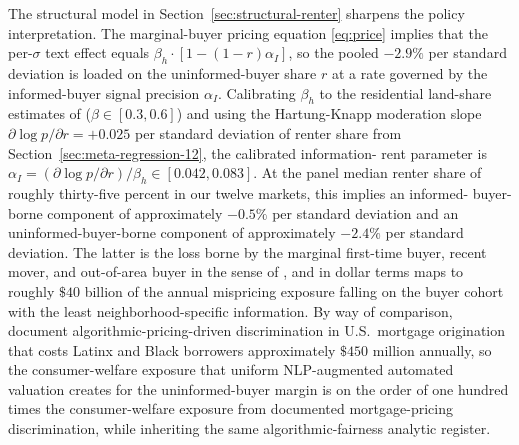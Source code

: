 The structural model in Section~\ref{sec:structural-renter} sharpens
the policy interpretation.  The marginal-buyer pricing equation
\eqref{eq:price} implies that the per-$\sigma$ text effect equals
$\beta_h \cdot [1 - (1-r)\alpha_I]$, so the pooled $-2.9\%$ per
standard deviation is loaded on the uninformed-buyer share $r$ at a
rate governed by the informed-buyer signal precision $\alpha_I$.
Calibrating $\beta_h$ to the residential land-share estimates of
\citet{davis2007price} ($\beta \in [0.3, 0.6]$) and using the
Hartung-Knapp moderation slope $\partial \log p / \partial r = +0.025$
per standard deviation of renter share from
Section~\ref{sec:meta-regression-12}, the calibrated information-
rent parameter is $\alpha_I = (\partial \log p / \partial r)/\beta_h
\in [0.042, 0.083]$.  At the panel median renter share of roughly
thirty-five percent in our twelve markets, this implies an informed-
buyer-borne component of approximately $-0.5\%$ per standard
deviation and an uninformed-buyer-borne component of approximately
$-2.4\%$ per standard deviation.  The latter is the loss borne by
the marginal first-time buyer, recent mover, and out-of-area buyer
in the sense of \citet{chinco2016misinformed}, and in dollar terms
maps to roughly $\$40$ billion of the annual mispricing exposure
falling on the buyer cohort with the least neighborhood-specific
information.  By way of comparison, \citet{bartlett2022consumer}
document algorithmic-pricing-driven discrimination in U.S.\ mortgage
origination that costs Latinx and Black borrowers approximately
$\$450$ million annually, so the consumer-welfare exposure that
uniform NLP-augmented automated valuation creates for the
uninformed-buyer margin is on the order of one hundred times the
consumer-welfare exposure from documented mortgage-pricing
discrimination, while inheriting the same algorithmic-fairness
analytic register.
